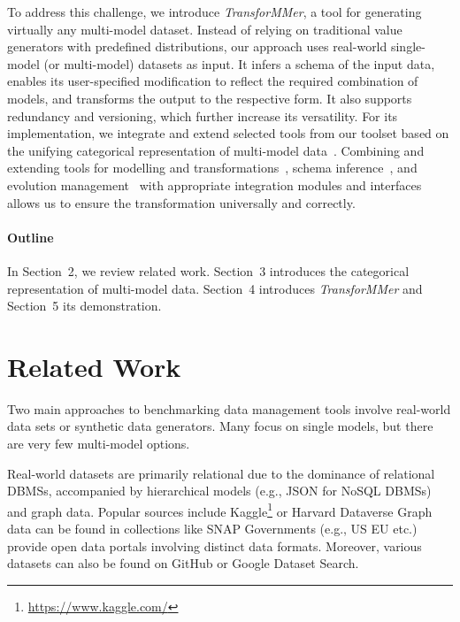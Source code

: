 To address this challenge, we introduce \textit{TransforMMer}, a tool for generating virtually any multi-model dataset. Instead of relying on traditional value generators with predefined distributions, our approach uses real-world single-model (or multi-model) datasets as input. It infers a schema of the input data, enables its user-specified modification to reflect the required combination of models, and transforms the output to the respective form. It also supports redundancy and versioning, which further increase its versatility. For its implementation, we integrate and extend selected tools from our toolset based on the unifying categorical representation of multi-model data~\citep{mm_cat_journal}. Combining and extending tools for modelling and transformations~\citep{mm_cat}, schema inference~\citep{mm_infer}, and evolution management~\citep{cikm_2022} with appropriate integration modules and interfaces allows us to ensure the transformation universally and correctly.

\paragraph{Outline} In Section~2, we review related work. Section~3 introduces the categorical representation of multi-model data. Section~4 introduces \textit{TransforMMer} and Section~5 its demonstration.


\section{Related Work}
Two main approaches to benchmarking data management tools involve real-world data sets or synthetic data generators. Many focus on single models, but there are very few multi-model options.

Real-world datasets are primarily relational due to the dominance of relational DBMSs, accompanied by hierarchical models (e.g., JSON for NoSQL DBMSs) and graph data. Popular sources include Kaggle\footnote{\url{https://www.kaggle.com/}} or Harvard Dataverse Graph data can be found in collections like SNAP Governments (e.g., US EU etc.) provide open data portals involving distinct data formats. Moreover, various datasets can also be found on GitHub or Google Dataset Search.

